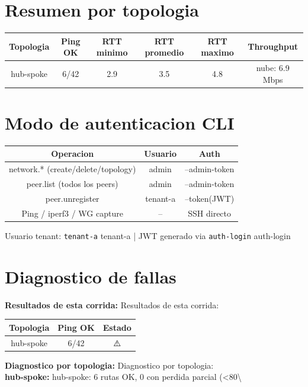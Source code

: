 \documentclass[11pt,a4paper]{article}
\begin{document}
\section{Resumen por topologia}
\begin{longtable}{|c|c|c|c|c|c|}
\hline
Topologia & Ping OK & RTT minimo & RTT promedio & RTT maximo & Throughput \\ \hline
hub-spoke & 6/42 & 2.9 & 3.5 & 4.8 & nube: 6.9 Mbps \\ \hline
\end{longtable}

\section{Modo de autenticacion CLI}
\begin{longtable}{|c|c|c|}
\hline
Operacion & Usuario & Auth \\ \hline
network.* (create/delete/topology) & admin & --admin-token \\ \hline
peer.list (todos los peers) & admin & --admin-token \\ \hline
peer.unregister & tenant-a & --token(JWT) \\ \hline
Ping / iperf3 / WG capture & -- & SSH directo \\ \hline
\end{longtable}

Usuario tenant:  \texttt{tenant-a} tenant-a  | JWT generado via  \texttt{auth-login} auth-login\\

\section{Diagnostico de fallas}
\textbf{Resultados de esta corrida:} Resultados de esta corrida:\\

\begin{longtable}{|c|c|c|}
\hline
Topologia & Ping OK & Estado \\ \hline
hub-spoke & 6/42 & ⚠️ \\ \hline
\end{longtable}

\textbf{Diagnostico por topologia:} Diagnostico por topologia:\\

\textbf{hub-spoke:} hub-spoke:  6 rutas OK, 0 con perdida parcial (<80\textbackslash{}%
\end{document}
